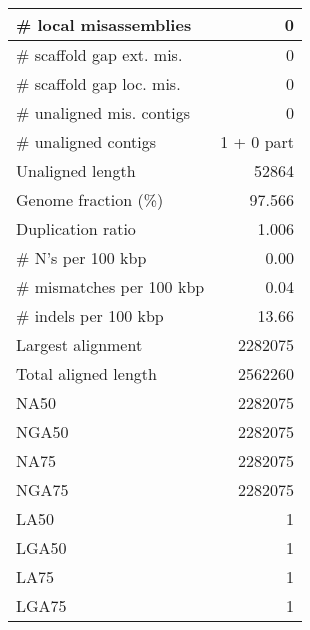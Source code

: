 \documentclass[12pt,a4paper]{article}
\begin{document}
\begin{table}[ht]
\begin{center}
\begin{tabular}{|l*{1}{|r}|}
\# local misassemblies & 0 \\ \hline
\# scaffold gap ext. mis. & 0 \\ \hline
\# scaffold gap loc. mis. & 0 \\ \hline
\# unaligned mis. contigs & 0 \\ \hline
\# unaligned contigs & 1 + 0 part \\ \hline
Unaligned length & 52864 \\ \hline
Genome fraction (\%) & 97.566 \\ \hline
Duplication ratio & 1.006 \\ \hline
\# N's per 100 kbp & 0.00 \\ \hline
\# mismatches per 100 kbp & 0.04 \\ \hline
\# indels per 100 kbp & 13.66 \\ \hline
Largest alignment & 2282075 \\ \hline
Total aligned length & 2562260 \\ \hline
NA50 & 2282075 \\ \hline
NGA50 & 2282075 \\ \hline
NA75 & 2282075 \\ \hline
NGA75 & 2282075 \\ \hline
LA50 & 1 \\ \hline
LGA50 & 1 \\ \hline
LA75 & 1 \\ \hline
LGA75 & 1 \\ \hline
\end{tabular}
\end{center}
\end{table}
\end{document}
